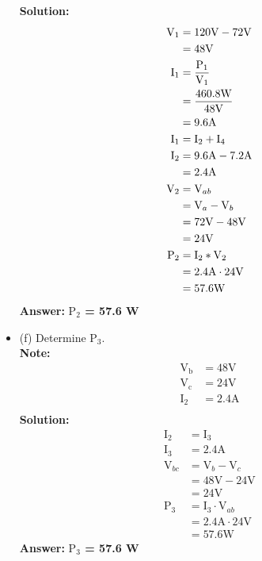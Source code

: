 \documentclass{article}
\begin{document}
\begin{itemize}
\begin{equation}
		\end{equation}
		\textbf{Solution:} \\
		\begin{align*}
			\text{V}_1 &= 120 \text{V} - 72 \text{V} \\
			&= 48 \text{V} \\
			\text{I}_1 &= { \text{P}_1 \over \text{V}_1 } \\
			&= { 460.8 \text{W} \over 48 \text{V} } \\
			&= 9.6 \text{A} \\
			\text{I}_1 &= \text{I}_2 + \text{I}_4 \\
			\text{I}_2 &= 9.6 \text{A} - 7.2 \text{A} \\
			&= 2.4 \text{A} \\		
			\text{V}_2 &= \text{V}_{ab} \\
			&= \text{V}_a - \text{V}_b \\
			&= 72 \text{V} - 48 \text{V} \\
			&= 24 \text{V} \\
			\text{P}_2 &= \text{I}_2 * \text{V}_2 \\
			&= 2.4 \text{A} \cdot 24 \text{V} \\
			&= 57.6 \text{W}
		\end{align*}
		\textbf{Answer:} \textbf{$\text{P}_{2}$ = 57.6 W}
	\item (f) Determine $\text{P}_3$. \\
		\textbf{Note:}
		\begin{align*}
			\text{V}_\text{b} &= 48 \text{V} \\
			\text{V}_\text{c} &= 24 \text{V} \\
			\text{I}_2 &= 2.4 \text{A} \\
		\end{align*}
		\textbf{Solution:}
		\begin{align*}
			\text{I}_2 &= \text{I}_3 \\
			\text{I}_3 &= 2.4 \text{A} \\
			\text{V}_{bc} &= \text{V}_{b} - \text{V}_{c} \\
			&= 48 \text{V} - 24 \text{V} \\
			&= 24 \text{V} \\
			\text{P}_3 &= \text{I}_3 \cdot \text{V}_{ab} \\
			&= 2.4 \text{A} \cdot 24 \text{V} \\
			&= 57.6 \text{W}
		\end{align*}
		\textbf{Answer:} \textbf{$\text{P}_{3}$ = 57.6 W}

\end{itemize}
\end{document}
